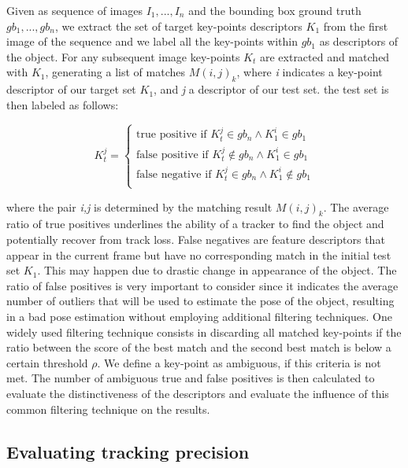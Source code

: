 Given as sequence of images $I_{1},...,I_{n}$ and the bounding box ground truth $gb_{1},...,gb_{n}$, we extract the set of target key-points descriptors $K_{1}$ from the first image of the sequence and we label all the key-points within $gb_{1}$ as descriptors of the object. For any subsequent image key-points $K_{t}$ are extracted and matched with $K_{1}$, generating a list of matches $M(i,j)_{k}$, where \textit{i} indicates a key-point descriptor of our target set $K_{1}$, and \textit{j} a descriptor of our test set. the test set is then labeled as follows:

\begin{equation}
K_{t}^{j} = 
\begin{cases}
\text{true positive}  \text{ if } K_{t}^{j} \in gb_{n} \land K_{1}^{i} \in gb_{1} \\
\text{false positive}  \text{ if } K_{t}^{j} \notin gb_{n} \land K_{1}^{i} \in gb_{1} \\
\text{false negative}  \text{ if } K_{t}^{j} \in gb_{n} \land K_{1}^{i} \notin gb_{1} \\
\end{cases}
\end{equation}

where the pair \textit{i,j} is determined by the matching result $M(i,j)_{k}$. The average ratio of true positives underlines the ability of a tracker to find the object and potentially recover from track loss. False negatives are feature descriptors that appear in the current frame but have no corresponding match in the initial test set $K_{1}$. This may happen due to drastic change in appearance of the object. The ratio of false positives is very important to consider since it indicates the average number of outliers that will be used to estimate the pose of the object, resulting in a bad pose estimation without employing additional filtering techniques. One widely used filtering technique consists in discarding all matched key-points if the ratio between the score of the best match and the second best match is below a certain threshold $\rho$. We define a key-point as ambiguous, if this criteria is not met. The  number of ambiguous true and false positives is then calculated to evaluate the distinctiveness of the descriptors and evaluate the influence of this common filtering technique on the results.

\subsection{Evaluating tracking precision}
\label{sec:accuracy}

